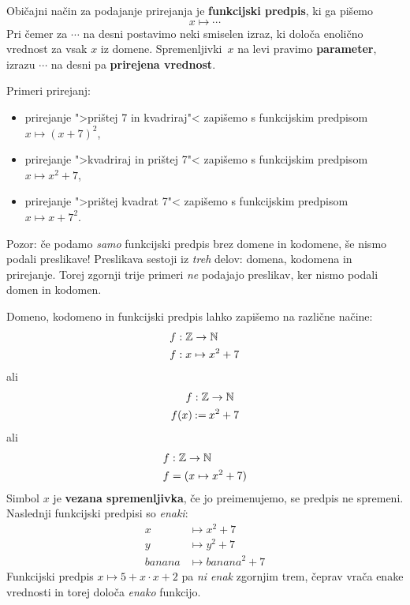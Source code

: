 Običajni način za podajanje prirejanja je \textbf{funkcijski predpis}, ki ga pišemo
%
\begin{equation*}
  x \mapsto \cdots
\end{equation*}
%
Pri čemer za $\cdots$ na desni postavimo neki smiselen izraz, ki določa enolično vrednost za vsak $x$ iz domene. Spremenljivki~$x$ na levi pravimo \textbf{parameter}, izrazu $\cdots$ na desni pa \textbf{prirejena vrednost}.

\begin{primer}
  Primeri prirejanj:
  \begin{itemize}
  \item prirejanje ">prištej 7 in kvadriraj"< zapišemo s funkcijskim predpisom  $x \mapsto (x + 7)^2$,
  \item prirejanje ">kvadriraj in prištej 7"< zapišemo s funkcijskim predpisom  $x \mapsto x^2 + 7$,
  \item prirejanje ">prištej kvadrat 7"< zapišemo s funkcijskim predpisom  $x \mapsto x + 7^2$.
  \end{itemize}
\end{primer}

\begin{opomba}
  Pozor: če podamo \emph{samo} funkcijski predpis brez domene in kodomene, še nismo podali preslikave! Preslikava sestoji iz \emph{treh} delov: domena, kodomena in prirejanje.
  Torej zgornji trije primeri \emph{ne} podajajo preslikav, ker nismo podali domen in
  kodomen.
\end{opomba}

Domeno, kodomeno in funkcijski predpis lahko zapišemo na različne načine:
%
\begin{align*}
  f &: \mathbb{Z} \to \mathbb{N} \\
  f &: x \mapsto x^2 + 7
\end{align*}
%
ali
%
\begin{align*}
    f &: \mathbb{Z} \to \mathbb{N} \\
    f(x) &\mathbin{{:}{=}} x^2 + 7
\end{align*}
%
ali
%
\begin{align*}
    f &: \mathbb{Z} \to \mathbb{N} \\
    f &= (x \mapsto x^2 + 7)
\end{align*}
%
Simbol $x$ je \textbf{vezana spremenljivka}, če jo preimenujemo, se predpis ne spremeni. Naslednji funkcijski predpisi so \emph{enaki}:
%
\begin{align*}
  x &\mapsto x^2 + 7 \\
  y &\mapsto y^2 + 7 \\
  \textit{banana} &\mapsto \textit{banana}^2 + 7
\end{align*}
%
Funkcijski predpis $x \mapsto 5 + x \cdot x + 2$ pa \emph{ni enak} zgornjim trem, čeprav vrača enake vrednosti in torej določa \emph{enako} funkcijo.

